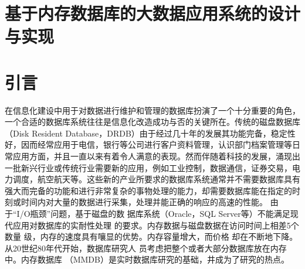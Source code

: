 \documentclass[literaturereview]{zjutreport}
\begin{document}



\frontmatter

\begingroup %
\let\clearpage\relax %

\titleformat{\chapter}[block]{\sihao\heiti\filcenter\bfseries}{\CJKnumber{\thechapter}}{1ex}{}{} %
\chapter*{基于内存数据库的大数据应用系统的设计与实现}
{} %


\mainmatter
\chapter{引言}
在信息化建设中用于对数据进行维护和管理的数据库扮演了一个十分重要的角色，一个合适的数据库系统往往是信息化改造成功与否的关键所在。传统的磁盘数据库（Disk Resident Database，DRDB）由于经过几十年的发展其功能完备，稳定性好，因而经常应用于电信，银行等公司进行客户资料管理，认识部门档案管理等日常应用方面，并且一直以来有着令人满意的表现。然而伴随着科技的发展，涌现出一批新兴行业或传统行业需要新的应用，例如工业控制，数据通信，证券交易，电力调度，航空航天等。这些新的产业所要求的数据库系统通常并不需要数据库具有强大而完备的功能和进行非常复杂的事物处理的能力，却需要数据库能在指定的时刻或时间内对大量的数据进行采集，处理并能正确的响应的高速的性能。
由于“I/O瓶颈”问题，基于磁盘的数
据库系统（Oracle，SQL Server等）不能满足现代应用对数据库的实耐性处理
的要求。内存数据与磁盘数据在访问时间上相差5个数量
级，内存的速度具有嚷显的优势。内存容量增大，而价格
却在不断地下降。从20世纪80年代开始，数据库研究人
员考虑把整个或者大部分数据库放在内存中。内存数据库
（MMDB）是实时数据库研究的基础，井成为了研究的热点。
\end{document}
